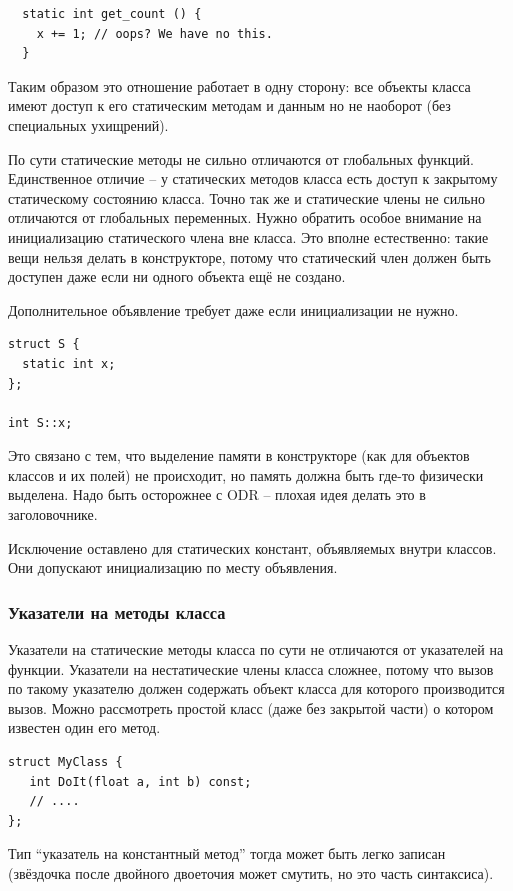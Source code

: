 \documentclass[a4paper,12pt,oneside]{article}
\begin{document}
\begin{lstlisting}
  static int get_count () { 
    x += 1; // oops? We have no this.
  }
\end{lstlisting}

Таким образом это отношение работает в одну сторону: все объекты класса имеют доступ к его статическим методам и данным но не наоборот (без специальных ухищрений).

По сути статические методы не сильно отличаются от глобальных функций. Единственное отличие -- у статических методов класса есть доступ к закрытому статическому состоянию класса. Точно так же и статические члены не сильно отличаются от глобальных переменных. Нужно обратить особое внимание на инициализацию статического члена вне класса. Это вполне естественно: такие вещи нельзя делать в  конструкторе, потому что статический член должен быть доступен даже если ни одного объекта ещё не создано.

Дополнительное объявление требует даже если инициализации не нужно.

\begin{lstlisting}
struct S {
  static int x;
};

int S::x;
\end{lstlisting}

Это связано с тем, что выделение памяти в конструкторе (как для объектов классов и их полей) не происходит, но память должна быть где-то физически выделена. Надо быть осторожнее с ODR -- плохая идея делать это в заголовочнике.

Исключение оставлено для статических констант, объявляемых внутри классов. Они допускают инициализацию по месту объявления.

\subsubsection{Указатели на методы класса}

Указатели на статические методы класса по сути не отличаются от указателей на функции. Указатели на нестатические члены класса сложнее, потому что вызов по такому указателю должен содержать объект класса для которого производится вызов. Можно рассмотреть простой класс (даже без закрытой части) о котором известен один его метод.

\begin{lstlisting}
struct MyClass {
   int DoIt(float a, int b) const;
   // ....
};
\end{lstlisting}

Тип ``указатель на константный метод'' тогда может быть легко записан (звёздочка после двойного двоеточия может смутить, но это часть синтаксиса).
\end{document}
